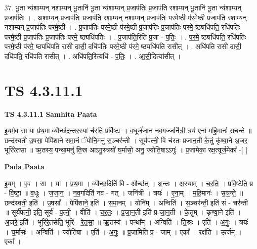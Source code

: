 \documentclass[17pt]{extarticle}
\begin{document}
37. भू॒ता न्य॑शाम्यन् नशाम्यन् भू॒तानि॑ भू॒ता न्य॑शाम्यन् प्र॒जाप॑तिः प्र॒जाप॑ति रशाम्यन् भू॒तानि॑ 
भू॒ता न्य॑शाम्यन् प्र॒जाप॑तिः । . अ॒शा॒म्य॒न् प्र॒जाप॑तिः प्र॒जाप॑ति रशाम्यन् नशाम्यन् प्र॒जाप॑तिः परमे॒ष्ठी प॑रमे॒ष्ठी प्र॒जाप॑ति रशाम्यन् नशाम्यन् प्र॒जाप॑तिः परमे॒ष्ठी । . प्र॒जाप॑तिः परमे॒ष्ठी प॑रमे॒ष्ठी प्र॒जाप॑तिः प्र॒जाप॑तिः परमे॒ ष्ठ्यधि॑पति॒ रधि॑पतिः परमे॒ष्ठी प्र॒जाप॑तिः प्र॒जाप॑तिः परमे॒ ष्ठ्यधि॑पतिः । . प्र॒जाप॑ति॒रिति॑ प्र॒जा - प॒तिः॒ । . प॒र॒मे॒ ष्ठ्यधि॑पति॒ रधि॑पतिः परमे॒ष्ठी प॑रमे॒ ष्ठ्यधि॑पति रासी दासी॒ दधि॑पतिः परमे॒ष्ठी प॑रमे॒ ष्ठ्यधि॑पति रासीत् । . अधि॑पति रासी दासी॒ दधि॑पति॒ रधि॑पति रासीत् । . अधि॑पति॒रित्यधि॑ - प॒तिः॒ । . आ॒सी॒दित्या॑सीत् । \newline
\pagebreak
{}

\section{ TS 4.3.11.1 }

\textbf{TS 4.3.11.1 } \newline
\textbf{Samhita Paata} \newline

इ॒यमे॒व सा या प्र॑थ॒मा व्यौच्छ॑द॒न्तर॒स्यां च॑रति॒ प्रवि॑ष्टा । व॒धूर्ज॑जान नव॒गज्जनि॑त्री॒ त्रय॑ एनां महि॒मानः॑ सचन्ते ॥ छन्द॑स्वती उ॒षसा॒ पेपि॑शाने समा॒नं ॅयोनि॒मनु॑ स॒ञ्चर॑न्ती । सूर्य॑पत्नी॒ वि च॑रतः प्रजान॒ती के॒तुं कृ॑ण्वा॒ने अ॒जर॒ भूरि॑रेतसा ॥ ऋ॒तस्य॒ पन्था॒मनु॑ ति॒स्र आऽगु॒स्त्रयो॑ घ॒र्मासो॒ अनु॒ ज्योति॒षाऽऽगुः॑ । प्र॒जामेका॒ रक्ष॒त्यूर्ज॒मेका᳚ -[  ] \newline

\textbf{Pada Paata} \newline

इ॒यम् । ए॒व । सा । या । प्र॒थ॒मा । व्यौच्छ॒दिति॑ वि - औच्छ॑त् । अ॒न्तः । अ॒स्याम् । च॒र॒ति॒ । प्रवि॒ष्टेति॒ प्र - वि॒ष्टा॒ ॥ व॒धूः । ज॒जा॒न॒ । न॒व॒गदिति॑ नव - गत् । जनि॑त्री । त्रयः॑ । ए॒ना॒म् । म॒हि॒मानः॑ । स॒च॒न्ते॒ ॥ छन्द॑स्वती॒ इति॑ । उ॒षसा᳚ । पेपि॑शाने॒ इति॑ । स॒मा॒नम् । योनि᳚म् । अन्विति॑ । स॒ञ्चर॑न्ती॒ इति॑ सं - चर॑न्ती ॥ सूर्य॑पत्नी॒ इति॒ सूर्य॑ - प॒त्नी॒ । वीति॑ । च॒र॒तः॒ । प्र॒जा॒न॒ती इति॑ प्र-जा॒न॒ती । के॒तुम् । कृ॒ण्वा॒ने इति॑ । अ॒जरे॒ इति॑ । भूरि॑रे॒तसेति॒ भूरि॑ - रे॒त॒सा॒ ॥ ऋ॒तस्य॑ । पन्था᳚म् । अन्विति॑ । ति॒स्रः । एति॑ । अ॒गुः॒ । त्रयः॑ । घ॒र्मासः॑ । अन्विति॑ । ज्योति॑षा । एति॑ । अ॒गुः॒ ॥ प्र॒जामिति॑ प्र - जाम् । एका᳚ । रक्ष॑ति । ऊर्ज᳚म् । एका᳚ ।  \newline
\end{document}

